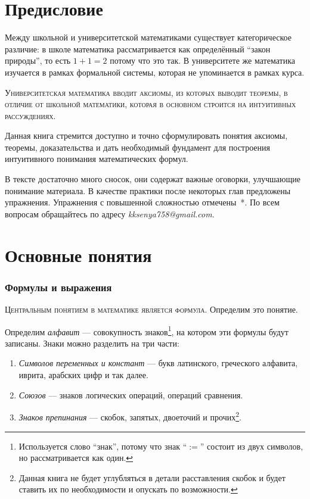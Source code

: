 \part{Предисловие}

Между школьной и университетской математиками существует категорическое
различие: в школе математика рассматривается как определённый ``закон природы'',
то есть $1+1=2$ потому что это так. В университете же математика изучается
в рамках формальной системы, которая не упоминается в рамках курса.

\textsc{Университетская математика вводит аксиомы, из которых выводит теоремы,
	в отличие от школьной математики, которая
	в основном строится на интуитивных рассуждениях.}

Данная книга стремится доступно и точно сформулировать понятия аксиомы,
теоремы, доказательства и дать необходимый фундамент для построения
интуитивного понимания математических формул.

В тексте достаточно много сносок, они содержат важные оговорки,
улучшающие понимание материала. В качестве практики
после некоторых глав предложены упражнения. Упражнения с повышенной сложностью
отмечены~*.
По всем вопросам обращайтесь по адресу {\sl kksenya758@gmail.com}.

\part{Основные понятия}

\section{Формулы и выражения}

\textsc{Центральным понятием в математике является формула.}
Определим это понятие.

Определим {\it алфавит} --- совокупность знаков\footnote{
	Используется слово ``знак'', потому что знак ``$:=$'' состоит из двух символов,
	но рассматривается как один.
}, на котором эти
формулы будут записаны. Знаки можно разделить на три части:
\begin{enumerate}
	\item{}{\it Символов переменных и констант} --- букв латинского, греческого алфавита,
	иврита, арабских цифр и так далее.
	\item{}{\it Союзов} --- знаков логических операций, операций сравнения.
	\item{}{\it Знаков препинания} --- скобок, запятых, двоеточий и прочих\footnote{
		Данная книга не будет углубляться в детали расставления скобок и будет ставить
		их по необходимости и опускать по возможности.
	}.
\end{enumerate}


